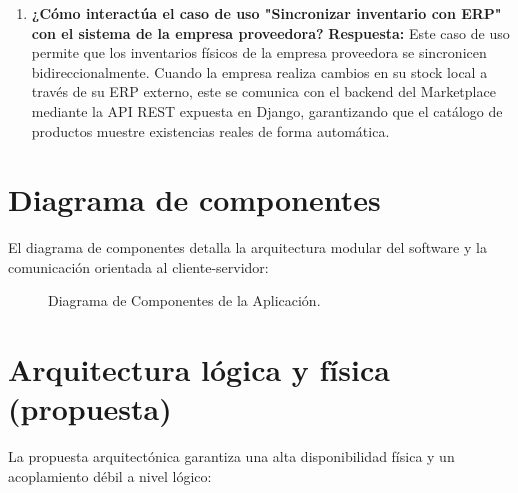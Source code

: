\documentclass[12pt,spanish,a4paper]{report}
\begin{document}
\begin{enumerate}
    \item \textbf{¿Cómo interactúa el caso de uso "Sincronizar inventario con ERP" con el sistema de la empresa proveedora?}
    \textbf{Respuesta:} Este caso de uso permite que los inventarios físicos de la empresa proveedora se sincronicen bidireccionalmente. Cuando la empresa realiza cambios en su stock local a través de su ERP externo, este se comunica con el backend del Marketplace mediante la API REST expuesta en Django, garantizando que el catálogo de productos muestre existencias reales de forma automática.
\end{enumerate}

\newpage
\section{Diagrama de componentes}
El diagrama de componentes detalla la arquitectura modular del software y la comunicación orientada al cliente-servidor:

\begin{figure}[h!]
\centering
{}
\caption{Diagrama de Componentes de la Aplicación.}
\label{fig:components}
\end{figure}

\section{Arquitectura lógica y física (propuesta)}
La propuesta arquitectónica garantiza una alta disponibilidad física y un acoplamiento débil a nivel lógico:
\end{document}
